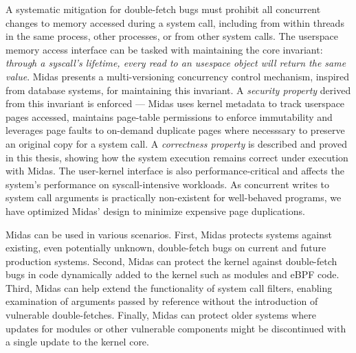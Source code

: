 A systematic mitigation for double-fetch bugs must prohibit all concurrent
changes to memory accessed during a system call, including from within
threads in the same process, other processes, or from other system calls.
The userspace memory access interface can be tasked with maintaining
the core invariant: 
\emph{through a syscall's lifetime, every read to an usespace object
will return the same value}.
Midas presents a multi-versioning concurrency control mechanism, inspired
from database systems, for maintaining this invariant. 
A \emph{security property} derived from this invariant is enforced ---
Midas uses kernel metadata to track userspace pages accessed, maintains
page-table permissions to enforce immutability and leverages page faults
to on-demand duplicate pages where necesssary to preserve an original
copy for a system call.
A \emph{correctness property} is described and proved in this thesis,
showing how the system execution remains correct under execution with
Midas.
The user-kernel interface is also performance-critical and affects the
system's performance on syscall-intensive workloads.
As concurrent writes to system call arguments is practically non-existent
for well-behaved programs, we have optimized Midas' design to minimize 
expensive page duplications.

Midas can be used in various scenarios. 
First, Midas protects systems against existing, even potentially unknown,
double-fetch bugs on current and future production systems.
Second, Midas can protect the kernel against double-fetch bugs in code
dynamically added to the kernel such as modules and eBPF code.
Third, Midas can help extend the functionality of system call filters,
enabling examination of arguments passed by reference without the introduction
of vulnerable double-fetches.
Finally, Midas can protect older systems where updates for modules or other
vulnerable components might be discontinued with a single update to the
kernel core.


